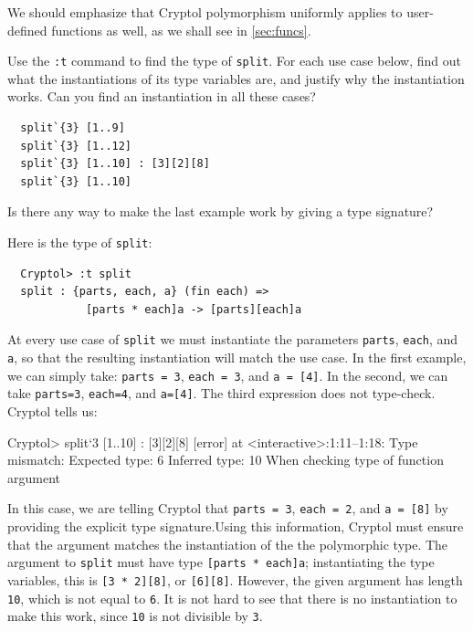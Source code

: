 We should emphasize that Cryptol polymorphism\indPolymorphism
uniformly applies to user-defined functions as well, as we shall see
in \autoref{sec:funcs}.

\begin{Exercise}\label{ex:poly:split}\indGroup
  Use the \texttt{:t} command to find the type of \texttt{split}. For
  each use case below, find out what the instantiations of its type
  variables are, and justify why the instantiation works. Can you find
  an instantiation in all these cases?
\begin{Verbatim}
  split`{3} [1..9]
  split`{3} [1..12]
  split`{3} [1..10] : [3][2][8]
  split`{3} [1..10]
\end{Verbatim}
Is there any way to make the last example work by giving a type signature?
\end{Exercise}
\begin{Answer}\indGroup
Here is the type of \texttt{split}:
\begin{Verbatim}
  Cryptol> :t split
  split : {parts, each, a} (fin each) =>
            [parts * each]a -> [parts][each]a
\end{Verbatim}
At every use case of \texttt{split} we must instantiate the parameters
\texttt{parts}, \texttt{each}, and \texttt{a}, so that the resulting
instantiation will match the use case. In the first example, we can
simply take: \texttt{parts = 3}, \texttt{each = 3}, and \texttt{a = [4]}. In
the second, we can take \texttt{parts=3}, \texttt{each=4}, and
\texttt{a=[4]}. The third expression does not type-check. Cryptol
tells us:
\restartrepl
\begin{replinVerb}
  Cryptol> split`{3} [1..10] : [3][2][8]
  [error] at <interactive>:1:11--1:18:
    Type mismatch:
      Expected type: 6
      Inferred type: 10
      When checking type of function argument
\end{replinVerb}
In this case, we are telling Cryptol that \texttt{parts = 3},
\texttt{each = 2}, and \texttt{a = [8]} by providing the explicit type
signature.\indSignature Using this information, Cryptol must ensure
that the argument matches the instantiation of the the polymorphic
type. The argument to \texttt{split} must have type \texttt{[parts *
    each]a}; instantiating the type variables, this is \texttt{[3 *
    2][8]}, or \texttt{[6][8]}. However, the given argument has length
\texttt{10}, which is not equal to \texttt{6}. It is not hard to see
that there is no instantiation to make this work, since \texttt{10} is
not divisible by \texttt{3}.
\end{Answer}

